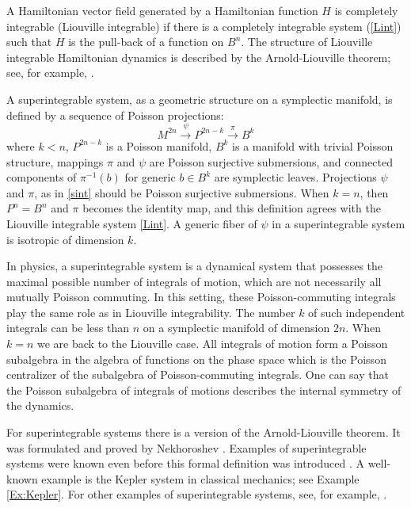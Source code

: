 \documentclass[12pt]{amsart}
\theoremstyle{definition}
\numberwithin{equation}{section}
\begin{document}
A Hamiltonian vector field generated by a Hamiltonian function $H$ is completely integrable 
(Liouville integrable) if there is a completely integrable system (\ref{Lint}) such that $H$ is the pull-back of a function on $B^{n}$. The structure of Liouville integrable Hamiltonian dynamics is described by the Arnold-Liouville theorem; see, for example, \cite{Arnold}.

A superintegrable system, as a geometric structure on a symplectic manifold, is defined by a sequence of Poisson projections:
\begin{equation}\label{sint}
M^{2n}\stackrel{\psi}\rightarrow P^{2n-k}\stackrel{\pi}\rightarrow B^{k}
\end{equation}
where $k<n$, $P^{2n-k}$ is a Poisson manifold, $B^{k}$ is a manifold with trivial Poisson structure,
mappings $\pi$ and $\psi$ are Poisson surjective submersions, and connected components of $\pi^{-1}(b) $ for generic $b\in B^{k}$ are symplectic leaves. Projections $\psi$ and $\pi$, as in \eqref{sint}  should be Poisson surjective submersions. When $k=n$, then $P^{n}=B^{n}$ and $\pi$ becomes the identity map, and this definition agrees with the Liouville integrable system \eqref{Lint}. A generic fiber of $\psi$ in a superintegrable system is isotropic of dimension $k$.

In physics, a superintegrable system is a dynamical system that possesses the maximal possible number of integrals of motion, which are not necessarily all mutually Poisson commuting.  In this setting, these Poisson-commuting integrals 
play the same role as   in Liouville integrability. The number $k$ of such independent integrals can be less than $n$ on a  symplectic manifold of dimension $2n$. When $k=n$ we are back to the Liouville case. All integrals of motion form a Poisson subalgebra in the algebra of functions on the phase space which is the Poisson centralizer of the subalgebra of Poisson-commuting integrals.  One can say that the Poisson subalgebra of integrals of motions describes the internal symmetry of the dynamics.

For superintegrable systems there is a version of the Arnold-Liouville theorem. It was formulated and proved by Nekhoroshev \cite{Nek1972}. Examples of superintegrable systems were known even before this formal definition was introduced \cite{Nek1972}. A well-known example is the Kepler system in classical mechanics; see  Example \ref{Ex:Kepler}. 
For other examples of superintegrable systems, see,  for example, \cite{Old-review,BF}.
\end{document}
